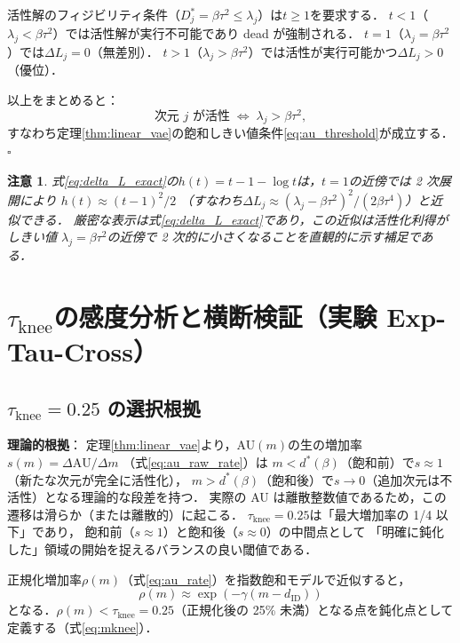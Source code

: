 \documentclass[11pt,a4paper]{jsarticle}
\newtheorem{remark}{注意}
\newcommand{\dID}{d_{\mathrm{ID}}}
\begin{document}
活性解のフィジビリティ条件（$D_j^* = \beta\tau^2 \leq \lambda_j$）は$t \geq 1$を要求する．
$t < 1$（$\lambda_j < \beta\tau^2$）では活性解が実行不可能であり dead が強制される．
$t = 1$（$\lambda_j = \beta\tau^2$）では$\Delta L_j = 0$（無差別）．
$t > 1$（$\lambda_j > \beta\tau^2$）では活性が実行可能かつ$\Delta L_j > 0$（優位）．

以上をまとめると：
\begin{equation}
  \text{次元 }j\text{ が活性} \;\Longleftrightarrow\; \lambda_j > \beta\tau^2,
\end{equation}
すなわち定理\ref{thm:linear_vae}の飽和しきい値条件\eqref{eq:au_threshold}が成立する．\hfill$\square$

\begin{remark}
式\eqref{eq:delta_L_exact}の$h(t) = t - 1 - \log t$は，$t = 1$の近傍では 2 次展開により
$h(t) \approx (t-1)^2/2$
（すなわち$\Delta L_j \approx (\lambda_j - \beta\tau^2)^2/(2\beta\tau^4)$）と近似できる．
厳密な表示は式\eqref{eq:delta_L_exact}であり，この近似は活性化利得がしきい値
$\lambda_j = \beta\tau^2$の近傍で 2 次的に小さくなることを直観的に示す補足である．
\end{remark}

\section{$\tau_{\mathrm{knee}}$の感度分析と横断検証（実験 Exp-Tau-Cross）}\label{app:tau_knee}

\subsection*{$\tau_{\mathrm{knee}} = 0.25$ の選択根拠}

\textbf{理論的根拠}：
定理\ref{thm:linear_vae}より，AU$(m)$の生の増加率$s(m) = \Delta\mathrm{AU}/\Delta m$
（式\eqref{eq:au_raw_rate}）は
$m < d^*(\beta)$（飽和前）で$s \approx 1$（新たな次元が完全に活性化），
$m > d^*(\beta)$（飽和後）で$s \to 0$（追加次元は不活性）となる理論的な段差を持つ．
実際の AU は離散整数値であるため，この遷移は滑らか（または離散的）に起こる．
$\tau_{\mathrm{knee}} = 0.25$は「最大増加率の 1/4 以下」であり，
飽和前（$s \approx 1$）と飽和後（$s \approx 0$）の中間点として
「明確に鈍化した」領域の開始を捉えるバランスの良い閾値である．

正規化増加率$\rho(m)$（式\eqref{eq:au_rate}）を指数飽和モデルで近似すると，
\begin{equation}
  \rho(m) \approx \exp(-\gamma (m - \dID))
  \label{eq:knee_curvature}
\end{equation}
となる．$\rho(m) < \tau_{\mathrm{knee}} = 0.25$（正規化後の 25\% 未満）となる点を鈍化点として定義する（式\eqref{eq:mknee}）．
\end{document}
